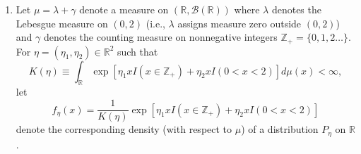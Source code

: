 \documentclass[12pt]{article}
\newcounter{ProofCounter}
\newenvironment{Solution}{\stepcounter{ProofCounter}\textbf{Solution:}}{\hfill$\square$}
\begin{document}
\begin{enumerate}[leftmargin=0cm, itemindent=0cm]
\begin{enumerate}
\item Prove or disprove:  If $T$ is  minimal sufficient for $\mathcal{P}$, then $T$ is  minimal sufficient for $\mathcal{P}_0$.\\

  \begin{Solution}
    No, $T$ is not necessarily minimal sufficient. Let $m$ denote Lebesgue measure on $[0,1]$ and consider the family $\mathcal{P}\equiv
    \{P_\theta:\theta \in \Theta\}$ where for $\theta = (\theta_1, \theta_2) \in \Theta := (0,\infty)^{2}$, $P_{\theta}$ is the Beta distribution with
    mean $\theta_1 / (\theta_1 + \theta_2)$. Then $T(X) := X$ is minimal sufficient for $\mathcal{P}$.

    Now take $\Theta_0 := \{(1,1)\}$ and $\mathcal{P}_0 := \{P_{\theta} : \theta \in \Theta_0\} = \{P_{(1,1)}\}$, where $P_{(1,1)}$ is the uniform
    distribution on $[0,1]$. Then $\frac{dP_{(1,1)}}{dm}(x) \equiv 1$ a.e. $m$. Thus, by the Factorization Theorem, any constant function $S(X) \equiv C
    > 0$
    is sufficient, as we can write $\frac{dP_{(1,1)}}{dm}(x) = g(S(x))\cdot C^{-1}$, where $g(\cdot)$ is the identity. However, clearly $T$ cannot 
    be expressed as a function of $S$, so $T$ is not sufficient for $\mathcal{P}_0$.
  \end{Solution}




\item Prove or disprove:  If $T$ is  complete for $\mathcal{P}_0$, then $T$ is  minimal sufficient for $\mathcal{P}_0$.

  \begin{Solution}
    This is true. If $T$ is sufficient for $\mathcal{P}$, then clearly $T$ is sufficient for $\mathcal{P}_0$ (consider the Factorization Theorem).
    Further, since $T$ is complete for $\mathcal{P}_0$, $T$ is boundedly complete for $\mathcal{P}_0$. Thus, by Bahadur's Theorem, $T$ is minimal
    sufficient for $\mathcal{P}_0$.
  \end{Solution}


\end{enumerate}

\vspace{0.5cm}

\item Let $\mu=\lambda+\gamma$ denote a measure on $(\mathbb{R},\mathcal{B}(\mathbb{R}))$ where $\lambda$ denotes
the Lebesgue measure on $(0,2)$ (i.e., $\lambda$ assigns measure zero outside $(0,2)$) and $\gamma$ denotes the counting measure on nonnegative integers $\mathbb{Z}_+=\{0,1,2\ldots\}$.
 For $\eta =(\eta_1,\eta_2) \in \mathbb{R}^2$ such that
 \[
   K(\eta) \equiv \int_{\mathbb{R}} \exp\left[  \eta_1 x I(x \in \mathbb{Z}_+) + \eta_2 x I(0<x<2)  \right] d\mu(x)<\infty,
 \]
let
\[
f_\eta (x) = \frac{1}{K(\eta)}\exp\left[  \eta_1 x I(x \in \mathbb{Z}_+) + \eta_2 x I(0<x<2)  \right]
\]
denote the corresponding density (with respect to $\mu$) of a distribution $P_\eta$ on $ \mathbb{R}$.



\end{enumerate}
\end{document}
